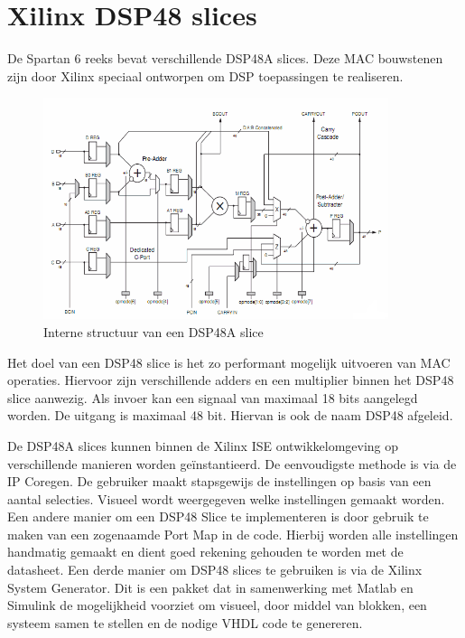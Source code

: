 	\section{Xilinx DSP48 slices}

		\par De Spartan 6 reeks bevat verschillende DSP48A slices. Deze MAC bouwstenen zijn door Xilinx speciaal ontworpen om DSP toepassingen te realiseren.

			\begin{figure}[H]					  
				  \centering
				  \includegraphics[width=0.90\textwidth]{Vooronderzoek/dsp48a.png}
				  \caption{Interne structuur van een DSP48A slice }
				  \label{pdi_simulink_resultaat}
			\end{figure}

		\par Het doel van een DSP48 slice is het zo performant mogelijk uitvoeren van MAC operaties. Hiervoor zijn verschillende adders en een multiplier binnen het DSP48 slice aanwezig. Als invoer kan een signaal van maximaal 18 bits aangelegd worden. De uitgang is maximaal 48 bit. Hiervan is ook de naam DSP48 afgeleid.

		\par De DSP48A slices kunnen binnen de Xilinx ISE ontwikkelomgeving op verschillende manieren worden ge\"instantieerd. De eenvoudigste methode is via de IP Coregen. De gebruiker maakt stapsgewijs de instellingen op basis van een aantal selecties. Visueel wordt weergegeven welke instellingen gemaakt worden. Een andere manier om een DSP48 Slice te implementeren is door gebruik te maken van een zogenaamde Port Map in de code. Hierbij worden alle instellingen handmatig gemaakt en dient goed rekening gehouden te worden met de datasheet. Een derde manier om DSP48 slices te gebruiken is via de Xilinx System Generator. Dit is een pakket dat in samenwerking met Matlab en Simulink de mogelijkheid voorziet om visueel, door middel van blokken, een systeem samen te stellen en de nodige VHDL code te genereren. 

